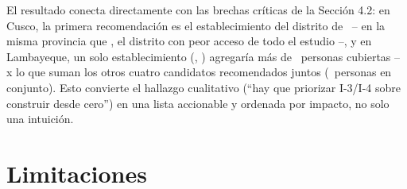 \documentclass[11pt]{article}
\begin{document}


El resultado conecta directamente con las brechas críticas de la Sección
4.2: en Cusco, la primera recomendación es el establecimiento
\textbf{\statSitingTopNameCusco} del distrito de
\statSitingTopDistrictCusco\ -- en la misma provincia que
\statWorstDistrictName, el distrito con peor acceso de todo el estudio --,
y en Lambayeque, un solo establecimiento (\statSitingTopNameLambayeque,
\statSitingTopDistrictLambayeque) agregaría más de \statSitingTopGainLambayeque\
personas cubiertas -- \statSitingTopVsRestRatioLambayeque x lo que suman
los otros cuatro candidatos recomendados juntos
(\statSitingRestGainLambayeque\ personas en conjunto).
Esto convierte el hallazgo cualitativo (``hay que priorizar I-3/I-4 sobre
construir desde cero'') en una lista accionable y ordenada por impacto, no
solo una intuición.

\section{Limitaciones}
\end{document}
